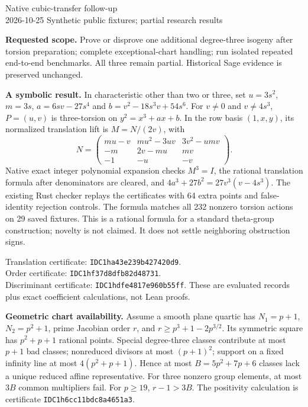 \documentclass[10pt]{article}
\begin{document}
\begin{center}
{\Large Native cubic-transfer follow-up}\\[4pt]
2026-10-25 \quad Synthetic public fixtures; partial research results
\end{center}

\textbf{Requested scope.} Prove or disprove one additional degree-three
isogeny after torsion preparation; complete exceptional-chart handling;
run isolated repeated end-to-end benchmarks. All three remain partial.
Historical Sage evidence is preserved unchanged.

\textbf{A symbolic result.} In characteristic other than two or three, set
$u=3s^2$, $m=3s$, $a=6sv-27s^4$ and
$b=v^2-18s^3v+54s^6$. For $v\ne0$ and $v\ne4s^3$,
$P=(u,v)$ is three-torsion on $y^2=x^3+ax+b$. In the row basis
$(1,x,y)$, its normalized translation lift is $M=N/(2v)$, with
\[
N=\left(\begin{array}{ccc}
mu-v & mu^2-3uv & 3v^2-umv\\
-m & 2v-mu & mv\\
-1 & -u & -v
\end{array}\right).
\]
Native exact integer polynomial expansion checks $M^3=I$, the rational
translation formula after denominators are cleared, and
$4a^3+27b^2=27v^3(v-4s^3)$. The existing Rust checker replays the
certificates with 64 extra points and false-identity rejection controls.
The formula matches all 232 nonzero torsion actions on 29 saved fixtures.
This is a rational formula for a standard theta-group construction;
novelty is not claimed. It does not settle neighboring obstruction signs.

Translation certificate: \texttt{IDC1ha43e239b427420d9}.\\
Order certificate: \texttt{IDC1hf37d8dfb82d48731}.\\
Discriminant certificate: \texttt{IDC1hdfe4817e960b55ff}.
These are evaluated records plus exact coefficient calculations, not Lean proofs.

\textbf{Geometric chart availability.} Assume a smooth plane quartic has
$N_1=p+1$, $N_2=p^2+1$, prime Jacobian order $r$, and
$r\ge p^3+1-2p^{3/2}$. Its symmetric square has $p^2+p+1$ rational points.
Special degree-three classes contribute at most $p+1$ bad classes;
nonreduced divisors at most $(p+1)^2$; support on a fixed infinity line
at most $4(p^2+p+1)$. Hence at most $B=5p^2+7p+6$ classes lack a
unique reduced affine representative. For three nonzero group elements,
at most $3B$ common multipliers fail. For $p\ge19$, $r-1>3B$.
The positivity calculation is certificate \texttt{IDC1h6cc11bdc8a4651a3}.
\end{document}
